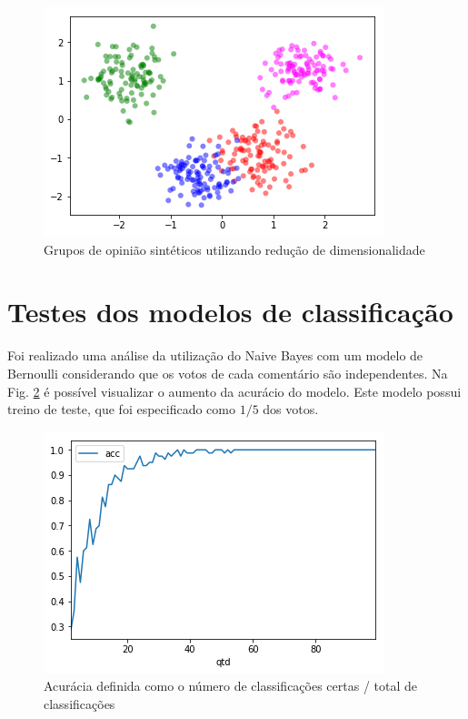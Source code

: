 \begin{figure}[!h]
	\centering
	\includegraphics[keepaspectratio=true,scale=0.65]{figuras/resultados-pca-1.png}
	\caption{Grupos de opinião sintéticos utilizando redução de dimensionalidade}
	\label{pca:4-categorias}
\end{figure}



\section{Testes dos modelos de classificação}

Foi realizado uma análise da utilização do Naive Bayes com um modelo de Bernoulli  %
considerando que os votos de cada comentário são independentes. Na Fig. \ref{pca:acc-bernoulli} é possível visualizar o aumento da acurácio do modelo. Este modelo possui  treino de teste, que foi especificado como $1/5$ dos votos.


\begin{figure}[!h]
	\centering
	\includegraphics[keepaspectratio=true,scale=0.6]{figuras/resultados-pca-acc.png}
	\caption{Acurácia definida como o número de classificações certas / total de classificações}
	\label{pca:acc-bernoulli}
\end{figure}



